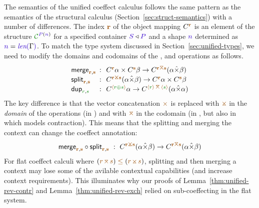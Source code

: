 The semantics of the unified coeffect calculus follows the same pattern as the semantics of the
structural calculus (Section~\ref{sec:struct-semantics}) with a number of differences. The 
index $\aclrd{\textbf{r}}$ of the object mapping $\ctyp{\aclrd{\textbf{r}}}$ is an element of 
the structure $\C^{\SP(\sclrd{n})}$ for a specified container $\SH \triangleleft \SP$ and a shape 
$\sclrd{n}$ determined as $\sclrd{n} = \slen{\Gamma}$. To match the type system discussed in 
Section~\ref{sec:unified-types}, we need to modify the domains and codomains of the , 
 and  operations as follows.
%
\begin{equation*}
\begin{array}{lcl}
 \ident{merge}_{\aclrd{\textbf{r}},\aclrd{\textbf{s}}} &\narrow{:}& 
  \ctyp{\aclrd{\textbf{r}}}{\alpha} \times \ctyp{\aclrd{\textbf{s}}}{\beta} \rightarrow \ctyp{\aclrd{\textbf{r}}\azip\aclrd{\textbf{s}}}{(\alpha \xtimes \beta)} \\
 \ident{split}_{\aclrd{\textbf{r}},\aclrd{\textbf{s}}} &\narrow{:}& 
  \ctyp{\aclrd{\textbf{r}}\apar\aclrd{\textbf{s}}}{(\alpha \xtimes \beta)} \rightarrow \ctyp{\aclrd{\textbf{r}}}{\alpha} \times \ctyp{\aclrd{\textbf{s}}}{\beta} \\
 \ident{dup}_{\cclrd{r}, \cclrd{s}} &\narrow{:}& 
  \ctyp{\alift{\cclrd{r} \cpar \cclrd{s}}}{\alpha} \rightarrow \ctyp{\alift{\cclrd{r}}\,\azip\,\alift{\cclrd{s}}}{(\alpha \xtimes \alpha)} \\
\end{array}
\end{equation*}
%
The key difference is that the vector concatenation $\atimes$ is replaced with $\apar$ in the
\emph{domain} of the operations (in ) and with $\azip$ in the codomain
(in , but also in  which models contraction).
This means that the splitting and merging the context can change the coeffect annotation:
%
\begin{equation*}
\ident{merge}_{\aclrd{\textbf{r}},\aclrd{\textbf{s}}} \circ \ident{split}_{\aclrd{\textbf{r}},\aclrd{\textbf{s}}} ~:~
  \ctyp{\aclrd{\textbf{r}}\apar\aclrd{\textbf{s}}}{(\alpha \xtimes \beta)}
  \rightarrow \ctyp{\aclrd{\textbf{r}}\azip\aclrd{\textbf{s}}}{(\alpha \xtimes \beta)} 
\end{equation*}
%
For flat coeffect calculi where $(\aclrd{r}\,\azip\,\aclrd{s}) \;\aclrd{\leq}\; (\aclrd{r}\,\apar\,\aclrd{s})$,
splitting and then merging a context may lose some of the avilable contextual capabilities
(and increase context requirements). This illuminates why our proofs of Lemma~\ref{thm:unified-rev-contr} 
and Lemma~\ref{thm:unified-rev-exch} relied on sub-coeffecting in the flat system.

